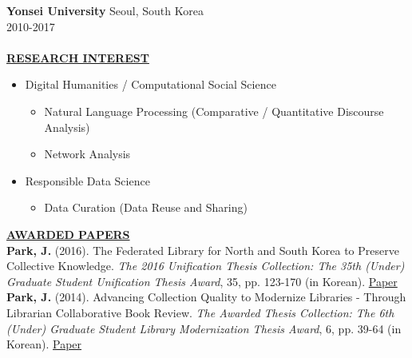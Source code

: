 \documentclass{article}
\begin{document}
\noindent \textbf{Yonsei University} \hfill Seoul, South Korea \\
 \hfill 2010-2017 \\
 \hfill \\

\noindent \textbf{\underline{RESEARCH INTEREST}} 
\begin{itemize}[noitemsep,nolistsep,leftmargin=*]
\item {Digital Humanities / Computational Social Science}
\begin{itemize}
    \item {Natural Language Processing (Comparative / Quantitative Discourse Analysis)}
    \item {Network Analysis}
\end{itemize}
\item {Responsible Data Science}
    \begin{itemize}
        \item {Data Curation (Data Reuse and Sharing)}
    \end{itemize}
\end{itemize}

%
%
\vspace{0.5cm}
\noindent \textbf{\underline{AWARDED PAPERS}} \\
\noindent \textbf{Park, J.} (2016). The Federated Library for North and South Korea to Preserve Collective Knowledge. \textit{The 2016 Unification Thesis Collection: The 35th (Under) Graduate Student Unification Thesis Award}, 35, pp. 123-170 (in Korean). \hfill \href{https://uniedu.go.kr/uniedu/home/pds/pdsatcl/view.do?id=19773&mid=SM00000532&limit=20&sc=T&eqOdrby=false&eqViewYn=true&odr=news}{Paper}\\ 

\noindent \textbf{Park, J.} (2014). Advancing Collection Quality to Modernize Libraries - Through Librarian Collaborative Book Review. \textit{The Awarded Thesis Collection: The 6th (Under) Graduate Student Library Modernization Thesis Award}, 6, pp. 39-64 (in Korean). \hfill \href{https://oak.go.kr/nl-ir/handle/2020.oak/304}{Paper}\\
\end{document}
